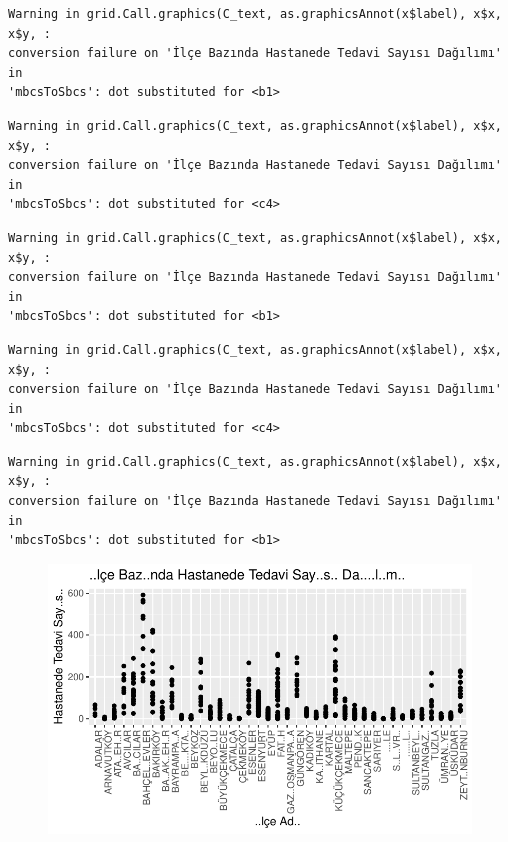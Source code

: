 \documentclass[
  11pt,
  a4paper,
  DIV=11,
  numbers=noendperiod]{scrartcl}
\begin{document}
\begin{verbatim}
Warning in grid.Call.graphics(C_text, as.graphicsAnnot(x$label), x$x, x$y, :
conversion failure on 'İlçe Bazında Hastanede Tedavi Sayısı Dağılımı' in
'mbcsToSbcs': dot substituted for <b1>
\end{verbatim}

\begin{verbatim}
Warning in grid.Call.graphics(C_text, as.graphicsAnnot(x$label), x$x, x$y, :
conversion failure on 'İlçe Bazında Hastanede Tedavi Sayısı Dağılımı' in
'mbcsToSbcs': dot substituted for <c4>
\end{verbatim}

\begin{verbatim}
Warning in grid.Call.graphics(C_text, as.graphicsAnnot(x$label), x$x, x$y, :
conversion failure on 'İlçe Bazında Hastanede Tedavi Sayısı Dağılımı' in
'mbcsToSbcs': dot substituted for <b1>
\end{verbatim}

\begin{verbatim}
Warning in grid.Call.graphics(C_text, as.graphicsAnnot(x$label), x$x, x$y, :
conversion failure on 'İlçe Bazında Hastanede Tedavi Sayısı Dağılımı' in
'mbcsToSbcs': dot substituted for <c4>
\end{verbatim}

\begin{verbatim}
Warning in grid.Call.graphics(C_text, as.graphicsAnnot(x$label), x$x, x$y, :
conversion failure on 'İlçe Bazında Hastanede Tedavi Sayısı Dağılımı' in
'mbcsToSbcs': dot substituted for <b1>
\end{verbatim}

\begin{figure}[H]

{\centering \includegraphics{project_files/figure-pdf/unnamed-chunk-4-3.pdf}

}

\end{figure}
\end{document}
